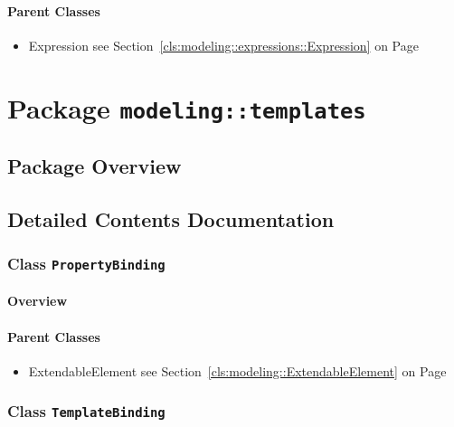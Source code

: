\paragraph{Parent Classes}
\begin{itemize}
\item Expression see Section~\ref{cls:modeling::expressions::Expression} on Page~\pageref{cls:modeling::expressions::Expression}\end{itemize}
\newpage
		


\section{Package \bfseries \texttt{modeling::templates}\normalfont}
\subsection{Package Overview}
		
		



\subsection{Detailed Contents Documentation}
\subsubsection{\Large{Class \bfseries \texttt{PropertyBinding}\normalfont}}
\label{cls:modeling::templates::PropertyBinding} 
\paragraph{Overview}

	



\paragraph{Parent Classes}
\begin{itemize}
\item ExtendableElement see Section~\ref{cls:modeling::ExtendableElement} on Page~\pageref{cls:modeling::ExtendableElement}\end{itemize}
\subsubsection{\Large{Class \bfseries \texttt{TemplateBinding}\normalfont}}
\label{cls:modeling::templates::TemplateBinding} 
